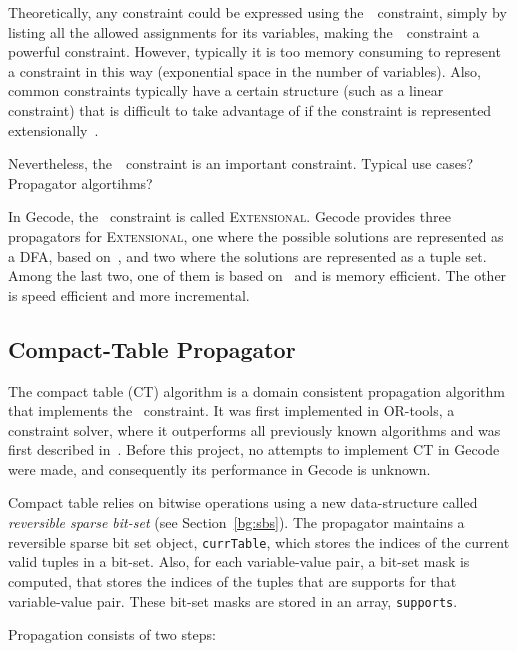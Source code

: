 \documentclass[a4paper,11pt]{article}
\newcommand{\Todo}[1]{{\color{blue}#1}}
\newcommand{\Secref}[1]{Section~\ref{#1}}
\newcommand{\Table}{\Constraint{Table}}
\newcommand{\Extensional}{\Constraint{Extensional}~}
\def\Extensional{\textsc{Extensional}}
\newcommand{\CTpaper}[0]{DBLP:conf/cp/DemeulenaereHLP16}
\numberwithin{equation}{section}
\begin{document}
Theoretically, any constraint could be expressed using the~\Table~constraint,
simply by listing all the allowed assignments for its variables, 
making the~\Table~constraint a powerful constraint. However, typically
it is too memory consuming to represent a constraint in this way
(exponential space in the number of variables). Also, common constraints
typically have a certain structure (such as a linear constraint)
that is difficult to take advantage of if the constraint is represented
extensionally~\cite{SchulteCarlsson:FDsys}.

Nevertheless, the~\Table~constraint is an important constraint.
\Todo{Typical use cases? Propagator algortihms?}

In Gecode, the \Table~constraint is called \Extensional. Gecode provides
three propagators for \Extensional, one where the possible solutions are
represented as a DFA, based on~\cite{Pesant:seqs}, and two where the solutions
are represented as a tuple set. Among the last two, one of them is
based on~\cite{DBLP:journals/ai/BessiereRYZ05} and is memory efficient.
The other is speed efficient and more incremental.

\subsection{Compact-Table Propagator}
\label{bg:ct}
The compact table (CT) algorithm is a domain consistent propagation algorithm
that implements the \Table~constraint. It was first implemented in
OR-tools, a constraint solver, where it outperforms all previously
known algorithms and was first described in~\cite{\CTpaper}.
Before this project, no attempts to implement CT in Gecode were made,
and consequently its performance in Gecode is unknown.

Compact table relies on bitwise operations using a new data-structure
called \emph{reversible sparse bit-set} (see \Secref{bg:sbs}).
The propagator maintains a reversible sparse bit set object, \texttt{currTable},
which stores the indices of the current valid tuples in a bit-set.
Also, for each variable-value pair, a bit-set mask is computed, that stores the
indices of the tuples that are supports for that variable-value pair.
These bit-set masks are stored in an array, \texttt{supports}.

Propagation consists of two steps:
\end{document}
